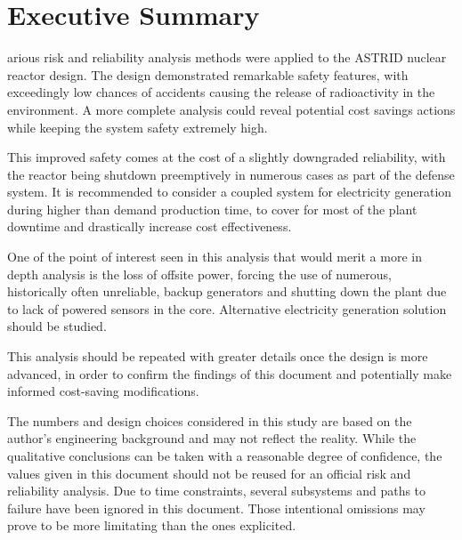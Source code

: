 %
%
%

\chapter*{Executive Summary}
\begin{SingleSpace}
arious risk and reliability analysis methods were applied to the ASTRID nuclear reactor design. The design demonstrated remarkable safety features, with exceedingly low chances of accidents causing the release of radioactivity in the environment. A more complete analysis could reveal potential cost savings actions while keeping the system safety extremely high.

This improved safety comes at the cost of a slightly downgraded reliability, with the reactor being shutdown preemptively in numerous cases as part of the defense system. It is recommended to consider a coupled system for electricity generation during higher than demand production time, to cover for most of the plant downtime and drastically increase cost effectiveness.

One of the point of interest seen in this analysis that would merit a more in depth analysis is the loss of offsite power, forcing the use of numerous, historically often unreliable, backup generators and shutting down the plant due to lack of powered sensors in the core. Alternative electricity generation solution should be studied.

This analysis should be repeated with greater details once the design is more advanced, in order to confirm the findings of this document and potentially make informed cost-saving modifications.

The numbers and design choices considered in this study are based on the author's engineering background and may not reflect the reality. While the qualitative conclusions can be taken with a reasonable degree of confidence, the values given in this document should not be reused for an official risk and reliability analysis. Due to time constraints, several subsystems and paths to failure have been ignored in this document. Those intentional omissions may prove to be more limitating than the ones explicited.
\end{SingleSpace}
\clearpage

